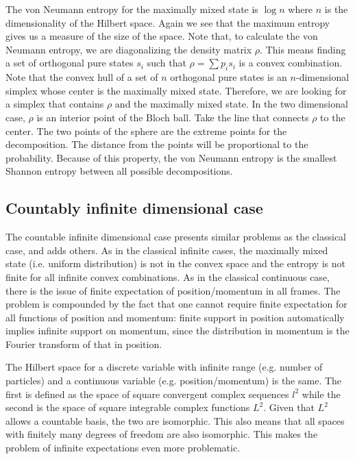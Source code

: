 The von Neumann entropy for the maximally mixed state is $\log n$ where $n$ is the dimensionality of the Hilbert space. Again we see that the maximum entropy gives us a measure of the size of the space. Note that, to calculate the von Neumann entropy, we are diagonalizing the density matrix $\rho$. This means finding a set of orthogonal pure states $s_i$ such that $\rho = \sum p_i s_i$ is a convex combination. Note that the convex hull of a set of $n$ orthogonal pure states is an $n$-dimensional simplex whose center is the maximally mixed state. Therefore, we are looking for a simplex that contains $\rho$ and the maximally mixed state. In the two dimensional case, $\rho$ is an interior point of the Bloch ball. Take the line that connects $\rho$ to the center. The two points of the sphere are the extreme points for the decomposition. The distance from the points will be proportional to the probability. Because of this property, the von Neumann entropy is the smallest Shannon entropy between all possible decompositions.


\subsection{Countably infinite dimensional case}

The countable infinite dimensional case presents similar problems as the classical case, and adds others. As in the classical infinite cases, the maximally mixed state (i.e. uniform distribution) is not in the convex space and the entropy is not finite for all infinite convex combinations. As in the classical continuous case, there is the issue of finite expectation of position/momentum in all frames. The problem is compounded by the fact that one cannot require finite expectation for all functions of position and momentum: finite support in position automatically implies infinite support on momentum, since the distribution in momentum is the Fourier transform of that in position.

The Hilbert space for a discrete variable with infinite range (e.g. number of particles) and a continuous variable (e.g. position/momentum) is the same. The first is defined as the space of square convergent complex sequences $l^2$ while the second is the space of square integrable complex functions $L^2$. Given that $L^2$ allows a countable basis, the two are isomorphic. This also means that all spaces with finitely many degrees of freedom are also isomorphic. This makes the problem of infinite expectations even more problematic.

